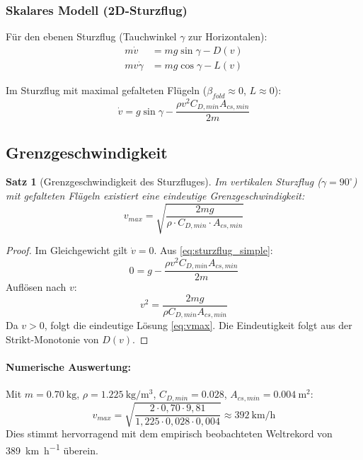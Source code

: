 ﻿\documentclass[12pt,a4paper]{article}
\newtheorem{theorem}{Satz}[section]
\theoremstyle{remark}
\begin{document}
	\subsubsection{Skalares Modell (2D-Sturzflug)}
	
	Für den ebenen Sturzflug (Tauchwinkel $\gamma$ zur Horizontalen):
	\begin{align}
		m\dot{v} &= mg\sin\gamma - D(v) \label{eq:2d_v} \\
		mv\dot{\gamma} &= mg\cos\gamma - L(v) \label{eq:2d_gamma}
	\end{align}
	
	Im Sturzflug mit maximal gefalteten Flügeln ($\beta_{fold} \approx 0$, $L \approx 0$):
	\begin{equation}
		\dot{v} = g\sin\gamma - \frac{\rho v^2 C_{D,min} A_{cs,min}}{2m}
		\label{eq:sturzflug_simple}
	\end{equation}
	
	\subsection{Grenzgeschwindigkeit}
	
	\begin{theorem}[Grenzgeschwindigkeit des Sturzfluges]
		\label{thm:grenz}
		Im vertikalen Sturzflug ($\gamma = 90^\circ$) mit gefalteten Flügeln existiert eine eindeutige Grenzgeschwindigkeit:
		\begin{equation}
			v_{max} = \sqrt{\frac{2mg}{\rho \cdot C_{D,min} \cdot A_{cs,min}}}
			\label{eq:vmax}
		\end{equation}
	\end{theorem}
	
	\begin{proof}
		Im Gleichgewicht gilt $\dot{v} = 0$. Aus \cref{eq:sturzflug_simple}:
		\[
		0 = g - \frac{\rho v^2 C_{D,min} A_{cs,min}}{2m}
		\]
		Auflösen nach $v$:
		\[
		v^2 = \frac{2mg}{\rho C_{D,min} A_{cs,min}}
		\]
		Da $v > 0$, folgt die eindeutige Lösung \cref{eq:vmax}. Die Eindeutigkeit folgt aus der Strikt-Monotonie von $D(v)$.
	\end{proof}
	
	\paragraph{Numerische Auswertung:} Mit $m = \SI{0.70}{\kg}$, $\rho = \SI{1.225}{\kg\per\m^3}$, $C_{D,min} = 0.028$, $A_{cs,min} = \SI{0.004}{\m^2}$:
	\begin{equation}
		v_{max} = \sqrt{\frac{2 \cdot 0{,}70 \cdot 9{,}81}{1{,}225 \cdot 0{,}028 \cdot 0{,}004}} \approx \SI{392}{\km\per\hour}
	\end{equation}
	Dies stimmt hervorragend mit dem empirisch beobachteten Weltrekord von \SI{389}{\km\per\hour} überein.
	
\end{document}
